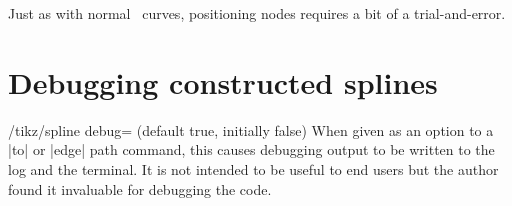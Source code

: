 \documentclass[a4paper]{ltxdoc}
\begin{document}
Just as with normal \tikzname\ curves, positioning nodes requires a bit of a
trial-and-error.

\section{Debugging constructed splines}
\begin{key}{/tikz/spline debug= (default true, initially false)}
When given as an option to a |to| or |edge| path command, this causes
debugging output to be written to the log and the terminal. It is not intended
to be useful to end users but the author found it invaluable for debugging the
code.
\end{key}

\printindex
\end{document}
